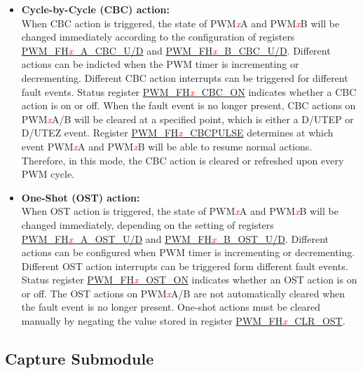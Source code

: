 \documentclass[main\_\_EN.tex]{subfiles}
\begin{document}
\begin{itemize}
    \item {\bfseries Cycle-by-Cycle (CBC) action:}\\
    When CBC action is triggered, the state of PWM\textcolor{red}{\it{x}}A and PWM\textcolor{red}{\it{x}}B will be changed immediately according to the configuration of registers \hyperref[regdesc:PWMFH0CFG0REG]{PWM\_FH\textcolor{red}{\it{x}}\_A\_CBC\_U/D} and \hyperref[regdesc:PWMFH0CFG0REG]{PWM\_FH\textcolor{red}{\it{x}}\_B\_CBC\_U/D}. Different actions can be indicted when the PWM timer is incrementing or decrementing. Different CBC action interrupts can be triggered for different fault events. Status register \hyperref[regdesc:PWMFH0STATUSREG]{PWM\_FH\textcolor{red}{\it{x}}\_CBC\_ON} indicates whether a CBC action is on or off.
   When the fault event is no longer present, CBC actions on PWM\textcolor{red}{\it{x}}A/B will be cleared at a specified point, which is either a D/UTEP or D/UTEZ event. Register \hyperref[regdesc:PWMFH0CFG1REG]{PWM\_FH\textcolor{red}{\it{x}}\_CBCPULSE} determines at which event PWM\textcolor{red}{\it{x}}A and PWM\textcolor{red}{\it{x}}B will be able to resume normal actions. Therefore, in this mode, the CBC action is cleared or refreshed upon every PWM cycle.
    \item {\bfseries One-Shot (OST) action:}\\
	When OST action is triggered, the state of PWM\textcolor{red}{\it{x}}A and PWM\textcolor{red}{\it{x}}B will be changed immediately, depending on the setting of registers \hyperref[regdesc:PWMFH0CFG0REG]{PWM\_FH\textcolor{red}{\it{x}}\_A\_OST\_U/D} and \hyperref[regdesc:PWMFH0CFG0REG]{PWM\_FH\textcolor{red}{\it{x}}\_B\_OST\_U/D}. Different actions can be configured when PWM timer is incrementing or decrementing. Different OST action interrupts can be triggered form different fault events. Status register \hyperref[regdesc:PWMFH0STATUSREG]{PWM\_FH\textcolor{red}{\it{x}}\_OST\_ON} indicates whether an OST action is on or off.
    The OST actions on PWM\textcolor{red}{\it{x}}A/B are not automatically cleared when the fault event is no longer present. One-shot actions must be cleared manually by negating the value stored in register \hyperref[regdesc:PWMFH0CFG0REG]{PWM\_FH\textcolor{red}{\it{x}}\_CLR\_OST}.
\end{itemize}

\subsection{Capture Submodule}
\end{document}
